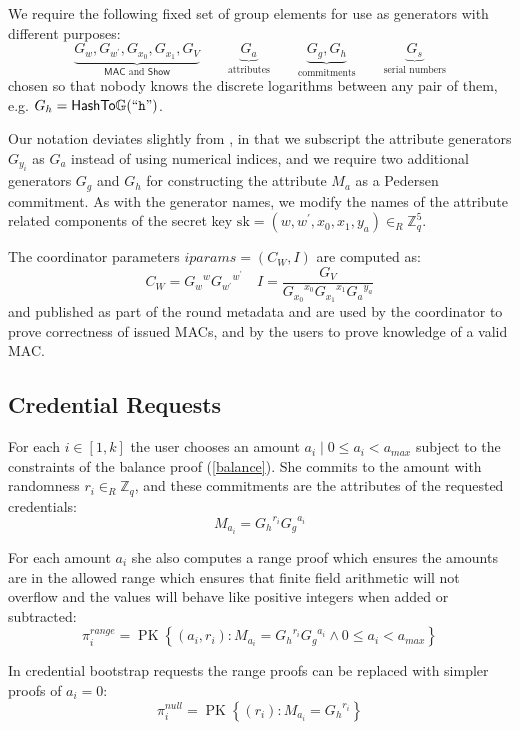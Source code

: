 \documentclass[a4paper]{article}
\begin{document}
We require the following fixed set of group elements for use as generators with different purposes:
\[
\underbrace{G_{w}, G_{w^{\prime}}, G_{x_{0}}, G_{x_{1}}, G_{V}}_{\mathsf{MAC} \text{~and~} \mathsf{Show}}
\qquad
\underbrace{G_a}_{\text{attributes}}
\qquad
\underbrace{G_g, G_h}_{\text{commitments}}
\qquad
\underbrace{G_s}_{\text{serial numbers}}
\]
chosen so that nobody knows the discrete logarithms between any pair of them, e.g. $G_h = \mathsf{HashTo\mathbb{G}}(``\texttt{h}")$.

Our notation deviates slightly from \cite{chase2019signal}, in that we subscript the attribute generators $G_{y_i}$ as $G_a$ instead of using numerical indices, and we require two additional generators $G_g$ and $G_h$ for constructing the attribute $M_a$ as a Pedersen commitment. As with the generator names, we modify the names of the attribute related components of the secret key
$\mathrm{sk} = (w, w^{\prime}, x_{0}, x_{1}, y_{a}) \in_R {\mathbb{Z}^5_q}$.

The coordinator parameters
$\mathit{iparams} =  (C_{W}, I)$
are computed as:
\[
C_{W}={G_w}^{w} {G_{w^\prime}}^{w^\prime}
\quad
I=\frac{G_{V}}{{G_{x_0}}^{x_0} {G_{x_1}}^{x_1} {G_a}^{y_a} }
\]
and published as part of the round metadata and are used by the coordinator to prove correctness of issued MACs, and by the users to prove knowledge of a valid MAC.

\subsection{Credential Requests}

For each $i \in [1, k]$ the user chooses an amount $a_i \mid 0 \leq a_i < a_{\mathit{max}}$ subject to the constraints of the balance proof (\cref{balance}). She commits to the amount with randomness $r_i \in_R \mathbb{Z}_q$, and these commitments are the attributes of the requested credentials:
\[ M_{a_i}={G_h}^{r_i}{G_g}^{a_i} \]

For each amount $a_i$ she also computes a range proof which ensures the amounts are in the allowed range which ensures that finite field arithmetic will not overflow and the values will behave like positive integers when added or subtracted:
\[
\pi^{\mathit{range}}_i = \operatorname{PK}\left\{\left(a_i, r_i \right) :
M_{a_i} = {G_h}^{r_i}{G_g}^{a_i}
\land
0 \leq a_i < a_{\mathit{max}} \right\}
\]

In credential bootstrap requests the range proofs can be replaced with simpler proofs of $a_i = 0$:
\[
  \pi^{\mathit{null}}_i = \operatorname{PK}\left\{ \left( r_i\right) :
    M_{a_i} = {G_{h}}^{r_i}
  \right\}
\]
\end{document}
